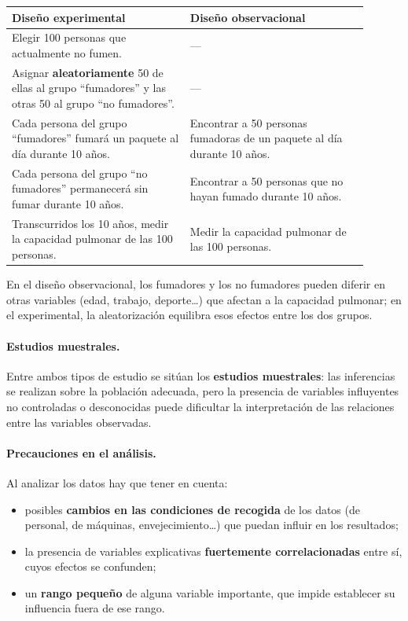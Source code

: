 \begin{ejemplo}
  \begin{center}
    \small
    \begin{tabular}{p{0.45\linewidth}p{0.45\linewidth}}
      \toprule
      \textbf{Diseño experimental} & \textbf{Diseño observacional} \\
      \midrule
      Elegir 100 personas que actualmente no fumen. & --- \\[2pt]
      Asignar \textbf{aleatoriamente} 50 de ellas al grupo ``fumadores'' y las otras 50 al
      grupo ``no fumadores''. & --- \\[2pt]
      Cada persona del grupo ``fumadores'' fumará un paquete al día durante 10 años. &
      Encontrar a 50 personas fumadoras de un paquete al día durante 10 años. \\[2pt]
      Cada persona del grupo ``no fumadores'' permanecerá sin fumar durante 10 años. &
      Encontrar a 50 personas que no hayan fumado durante 10 años. \\[2pt]
      Transcurridos los 10 años, medir la capacidad pulmonar de las 100 personas. &
      Medir la capacidad pulmonar de las 100 personas. \\
      \bottomrule
    \end{tabular}
  \end{center}
  En el diseño observacional, los fumadores y los no fumadores pueden diferir en otras
  variables (edad, trabajo, deporte\ldots) que afectan a la capacidad pulmonar; en el
  experimental, la aleatorización equilibra esos efectos entre los dos grupos.
\end{ejemplo}

\paragraph{Estudios muestrales.} Entre ambos tipos de estudio se sitúan los \textbf{estudios
muestrales}: las inferencias se realizan sobre la población adecuada, pero la presencia de
variables influyentes no controladas o desconocidas puede dificultar la interpretación de las
relaciones entre las variables observadas.

\paragraph{Precauciones en el análisis.} Al analizar los datos hay que tener en cuenta:
\begin{itemize}
  \item posibles \textbf{cambios en las condiciones de recogida} de los datos (de personal, de
    máquinas, envejecimiento\ldots) que puedan influir en los resultados;
  \item la presencia de variables explicativas \textbf{fuertemente correlacionadas} entre sí,
    cuyos efectos se confunden;
  \item un \textbf{rango pequeño} de alguna variable importante, que impide establecer su
    influencia fuera de ese rango.
\end{itemize}

